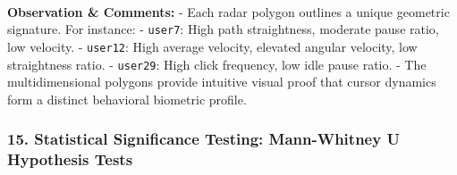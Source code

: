 \documentclass[11pt]{article}
\begin{document}
    \begin{center}
    \end{center}
    { \hspace*{\fill} \\}
    
    \textbf{Observation \& Comments:} - Each radar polygon outlines a unique
geometric signature. For instance: - \texttt{user7}: High path
straightness, moderate pause ratio, low velocity. - \texttt{user12}:
High average velocity, elevated angular velocity, low straightness
ratio. - \texttt{user29}: High click frequency, low idle pause ratio. -
The multidimensional polygons provide intuitive visual proof that cursor
dynamics form a distinct behavioral biometric profile.

    \subsubsection{15. Statistical Significance Testing: Mann-Whitney U
Hypothesis
Tests}\label{statistical-significance-testing-mann-whitney-u-hypothesis-tests}
\end{document}
